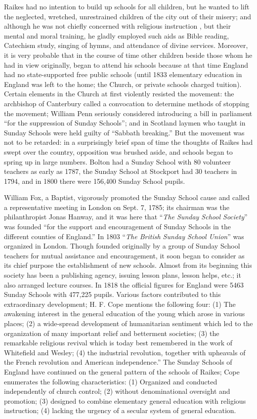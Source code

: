 Raikes had no intention to build up schools for all children, but he wanted to lift the neglected, wretched, unrestrained children of the city out of their misery; and although he was not chiefly concerned with religious instruction
, but their mental and moral training, he gladly employed such aids as Bible reading, Catechism study, singing of hymns, and attendance of divine services. Moreover, it is very probable that in the course of time other children beside those whom he had in view originally, began to attend his schools because at that time England had no state-supported free public schools (until 1833 elementary education in England was left to the home; the Church, or private schools charged tuition). Certain elements in the Church at first violently resisted the movement: the archbishop of Canterbury called a convocation to determine methods of stopping the movement; William Penn seriously considered introducing a bill in parliament “for the suppression of Sunday Schools”; and in Scotland laymen who taught in Sunday Schools were held guilty of “Sabbath breaking.” But the movement was not to be retarded: in a surprisingly brief span of time the thoughts of Raikes had swept over the country, opposition was brushed aside, and schools began to spring up in large numbers. Bolton had a Sunday School with 80 volunteer teachers as early as 1787, the Sunday School at Stockport had 30 teachers in 1794, and in 1800 there were 156,400 Sunday School pupils.

William Fox, a Baptist, vigorously promoted the Sunday School cause and called a representative meeting in London on Sept. 7, 1785; its chairman was the philanthropist Jonas Hanway, and it was here that “\emph{The Sunday School Society}” was founded “for the support and encouragement of Sunday Schools in the different counties of England.” In 1803 “\emph{The British Sunday School Union}” was organized in London. Though founded originally by a group of Sunday School teachers for mutual assistance and encouragement, it soon began to consider as its chief purpose the establishment of new schools. Almost from its beginning this society has been a publishing agency, issuing lesson plans, lesson helps, etc.;
it also arranged lecture courses. In 1818 the official figures for England were 5463 Sunday Schools with 477,225 pupils. Various factors contributed to this extraordinary development; H. F. Cope mentions the following four: (1) The awakening interest in the general education of the young which arose in various places; (2) a wide-spread development of humanitarian sentiment which led to the organization of many important relief and betterment societies; (3) the remarkable religious revival which is today best remembered in the work of Whitefield and Wesley; (4) the industrial revolution, together with upheavals of the French revolution and American independence.” The Sunday Schools of England have continued on the general pattern of the schools of Raikes; Cope enumerates the following characteristics: (1) Organized and conducted independently of church control; (2) without denominational oversight and promotion; (3) designed to combine elementary general education with religious instruction; (4) lacking the urgency of a secular system of general education.

